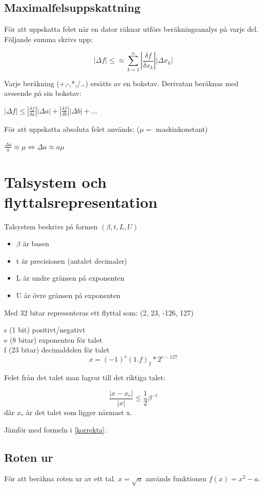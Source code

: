 \documentclass[12pt,a4paper]{article}
\begin{document}
\newpage
\subsection{Maximalfelsuppskattning}
För att uppskatta felet när en dator räknar utförs beräkningsanalys på varje del.
Följande summa skrivs upp:

$$ | \Delta f| \leq \approx \sum_{k=1}^{n} | \frac{\delta f}{\delta x_k} | | \Delta x_k| $$

Varje beräkning (+,-,*,/\ldots) ersätts av en bokstav.
Derivatan beräknas med avseende på sin bokstav:

$ |\Delta f| \leq |\frac{\delta f}{\delta a}| |\Delta a| +
|\frac{\delta f}{\delta b}| |\Delta b| + \ldots $

För att uppskatta absoluta felet används: ($\mu =$ maskinkonstant)

$ \frac{\Delta a}{a} \approx \mu \Leftrightarrow \Delta a \approx a\mu$

\section{Talsystem och flyttalsrepresentation}
Talsystem beskrivs på formen $(\beta, t, L, U)$
\begin{itemize}
	\item{$\beta$ är basen}
	\item{t är precisionen (antalet decimaler)}
	\item{L är undre gränsen på exponenten}
	\item{U är övre gränsen på exponenten}
\end{itemize}

Med 32 bitar representeras ett flyttal som:
(2, 23, -126, 127)

s (1 bit) positivt/negativt \\
e (8 bitar) exponenten för talet \\
f (23 bitar) decimaldelen för talet \\
\Large
$$ x = (-1)^s(1.f)_2*2^{e-127} $$
\large

Felet från det talet man lagrar till det riktiga talet:

\Large
$$ \frac{|x-x_r|}{|x|} \leq \frac{1}{2}\beta^{-t}$$
\large
där $x_r$ är det talet som ligger närmast x.

Jämför med formeln i \ref{korrekta}.

\subsection{Roten ur}
För att beräkna roten ur av ett tal. $ x = \sqrt{a}$ används funktionen $ f(x) = x^2 - a$.
\end{document}

